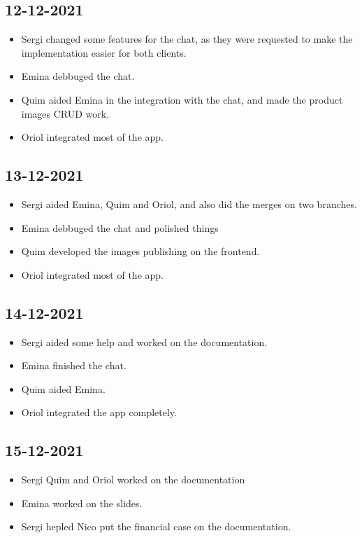 \documentclass[./main.tex]{subfiles}
\begin{document}
\subsection{12-12-2021}
\begin{itemize}
	\item Sergi changed some features for the chat, as they were requested to make the implementation easier for both clients.
	\item Emina debbuged the chat.
	\item Quim aided Emina in the integration with the chat, and made the product images CRUD work.
	\item Oriol integrated most of the app.
\end{itemize}

\subsection{13-12-2021}
\begin{itemize}
	\item Sergi aided Emina, Quim and Oriol, and also did the merges on two branches.
	\item Emina debbuged the chat and polished things
	\item Quim developed the images publishing on the frontend.
	\item Oriol integrated most of the app.
\end{itemize}

\subsection{14-12-2021}
\begin{itemize}
	\item Sergi aided some help and worked on the documentation.
	\item Emina finished the chat.
	\item Quim aided Emina.
	\item Oriol integrated the app completely.
\end{itemize}


\subsection{15-12-2021}
\begin{itemize}
	\item Sergi Quim and Oriol worked on the documentation
	\item Emina worked on the slides.
	\item Sergi hepled Nico put the financial case on the documentation.
\end{itemize}
\end{document}
